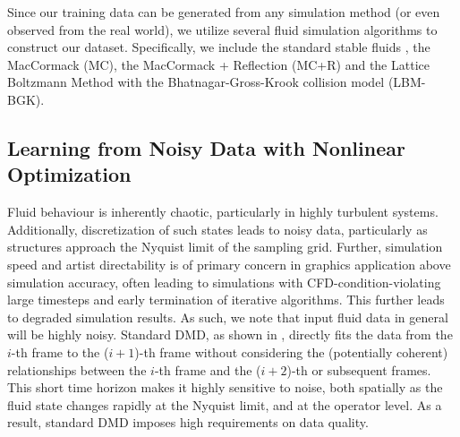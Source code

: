 Since our training data can be generated from any simulation method (or even observed from the real world), we utilize several fluid simulation algorithms to construct our dataset. Specifically, we include the standard stable fluids \cite{stam1999stable}, the MacCormack \cite{selle2008unconditionally} (MC), the MacCormack + Reflection \cite{zehnder2018advection} (MC+R) and the Lattice Boltzmann Method with the Bhatnagar-Gross-Krook collision model \cite{chen1998lattice} (LBM-BGK).

\subsection{Learning from Noisy Data with Nonlinear Optimization}

Fluid behaviour is inherently chaotic, particularly in highly turbulent systems. Additionally, discretization of such states leads to noisy data, particularly as structures approach the Nyquist limit of the sampling grid. Further, simulation speed and artist directability is of primary concern in graphics application above simulation accuracy, often leading to simulations with CFD-condition-violating large timesteps and early termination of iterative algorithms. This further leads to degraded simulation results. As such, we note that input fluid data in general will be highly noisy.
Standard DMD, as shown in , directly fits the data from the $i$-th frame to the ($i+1$)-th frame without considering the (potentially coherent) relationships between the $i$-th frame and the ($i+2$)-th or subsequent frames. This short time horizon makes it highly sensitive to noise, both spatially as the fluid state changes rapidly at the Nyquist limit, and at the operator level. As a result, standard DMD imposes high requirements on data quality. 

